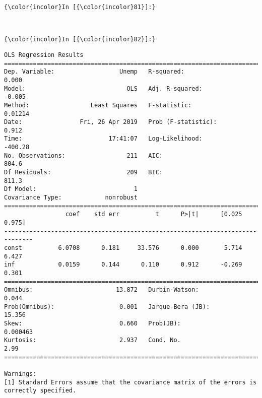 \documentclass[11pt]{article}
\begin{document}
    \begin{Verbatim}[commandchars=\\\{\}]
{\color{incolor}In [{\color{incolor}81}]:} 
\end{Verbatim}


    \begin{center}
    \end{center}
    { \hspace*{\fill} \\}
    
    \begin{Verbatim}[commandchars=\\\{\}]
{\color{incolor}In [{\color{incolor}82}]:} 
\end{Verbatim}


    \begin{Verbatim}[commandchars=\\\{\}]
                            OLS Regression Results                            
==============================================================================
Dep. Variable:                  Unemp   R-squared:                       0.000
Model:                            OLS   Adj. R-squared:                 -0.005
Method:                 Least Squares   F-statistic:                   0.01214
Date:                Fri, 26 Apr 2019   Prob (F-statistic):              0.912
Time:                        17:41:07   Log-Likelihood:                -400.28
No. Observations:                 211   AIC:                             804.6
Df Residuals:                     209   BIC:                             811.3
Df Model:                           1                                         
Covariance Type:            nonrobust                                         
==============================================================================
                 coef    std err          t      P>|t|      [0.025      0.975]
------------------------------------------------------------------------------
const          6.0708      0.181     33.576      0.000       5.714       6.427
inf            0.0159      0.144      0.110      0.912      -0.269       0.301
==============================================================================
Omnibus:                       13.872   Durbin-Watson:                   0.044
Prob(Omnibus):                  0.001   Jarque-Bera (JB):               15.356
Skew:                           0.660   Prob(JB):                     0.000463
Kurtosis:                       2.937   Cond. No.                         2.99
==============================================================================

Warnings:
[1] Standard Errors assume that the covariance matrix of the errors is correctly specified.

    \end{Verbatim}
\end{document}
